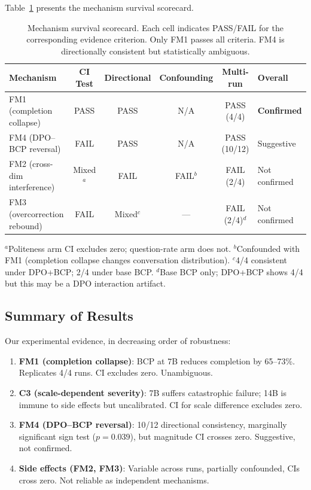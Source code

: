\documentclass[11pt,a4paper]{article}
\begin{document}
Table~\ref{tab:scorecard} presents the mechanism survival scorecard.

\begin{table}[t]
\centering
\caption{Mechanism survival scorecard. Each cell indicates PASS/FAIL for the corresponding evidence criterion. Only FM1 passes all criteria. FM4 is directionally consistent but statistically ambiguous.}
\label{tab:scorecard}
\small
\begin{tabular}{@{}lccccl@{}}
\toprule
Mechanism & CI Test & Directional & Confounding & Multi-run & Overall \\
\midrule
FM1 (completion collapse)   & PASS & PASS & N/A  & PASS (4/4) & \textbf{Confirmed} \\
FM4 (DPO--BCP reversal)     & FAIL & PASS & N/A  & PASS (10/12) & Suggestive \\
FM2 (cross-dim interference) & Mixed$^a$ & FAIL & FAIL$^b$ & FAIL (2/4) & Not confirmed \\
FM3 (overcorrection rebound) & FAIL & Mixed$^c$ & ---  & FAIL (2/4)$^d$ & Not confirmed \\
\bottomrule
\end{tabular}

\vspace{2pt}
{\footnotesize $^a$Politeness arm CI excludes zero; question-rate arm does not. $^b$Confounded with FM1 (completion collapse changes conversation distribution). $^c$4/4 consistent under DPO+BCP; 2/4 under base BCP. $^d$Base BCP only; DPO+BCP shows 4/4 but this may be a DPO interaction artifact.}
\end{table}

\subsection{Summary of Results}

Our experimental evidence, in decreasing order of robustness:

\begin{enumerate}
    \item \textbf{FM1 (completion collapse)}: BCP at 7B reduces completion by 65--73\%. Replicates 4/4 runs. CI excludes zero. Unambiguous.
    \item \textbf{C3 (scale-dependent severity)}: 7B suffers catastrophic failure; 14B is immune to side effects but uncalibrated. CI for scale difference excludes zero.
    \item \textbf{FM4 (DPO--BCP reversal)}: 10/12 directional consistency, marginally significant sign test ($p=0.039$), but magnitude CI crosses zero. Suggestive, not confirmed.
    \item \textbf{Side effects (FM2, FM3)}: Variable across runs, partially confounded, CIs cross zero. Not reliable as independent mechanisms.
\end{enumerate}
\end{document}
